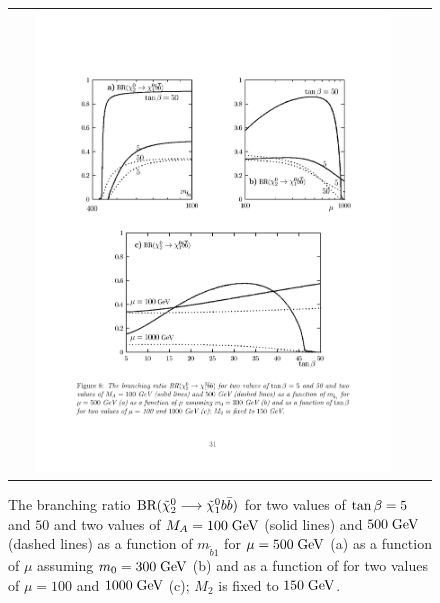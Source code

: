 \begin{figure}[tbh!]
	\centering
	\begin{tabular}{cc}
		\includegraphics[width=0.90\textwidth]{theory/pics/br_chibbarb.pdf}
	\end{tabular}
	\caption{The branching ratio $\text{BR}(\tilde{\chi}^{0}_{2} \longrightarrow \tilde{\chi}^{0}_{1} b \bar{b})$ for two values of $\tan\beta = 5$ and $50$ and two values of $M_{A} = 100\;\text{Ge}\kern-0.06667em\text{V}$ (solid lines) and $500\;\text{Ge}\kern-0.06667em\text{V}$ (dashed lines) as a function of $m_{\widetilde{b}1}$ for $\mu = 500\;\text{Ge}\kern-0.06667em\text{V} $ (a) as a function of $\mu$ assuming $m_{0} = 300\;\text{Ge}\kern-0.06667em\text{V}$ (b) and as a function of \tanbeta for two values of $\mu = 100$ and $1000\;\text{Ge}\kern-0.06667em\text{V}$ (c); $M_{2}$ is fixed to $150\;\text{Ge}\kern-0.06667em\text{V}$\cite{Djouadi:2001fa}.}
	\label{fig:br_chibbarb}
	\end{figure}

\FloatBarrier

\clearpage
